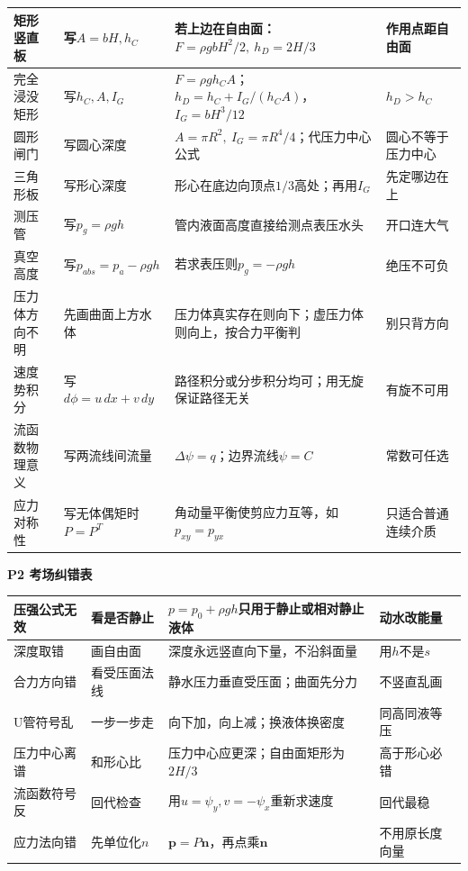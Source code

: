 \documentclass[UTF8,a4paper]{ctexart}
\newcommand{\ftitle}[1]{\vspace{1pt}\textbf{\textcolor{B}{#1}}\par\vspace{0.5pt}}
\begin{document}
\begin{tabular}{|L{0.19\textwidth}|L{0.23\textwidth}|L{0.34\textwidth}|L{0.19\textwidth}|}\hline
矩形竖直板 & 写$A=bH,h_C$ & 若上边在自由面：$F=\rho gbH^2/2,\ h_D=2H/3$ & 作用点距自由面 \\\hline
完全浸没矩形 & 写$h_C,A,I_G$ & $F=\rho gh_CA$；$h_D=h_C+I_G/(h_CA)$，$I_G=bH^3/12$ & $h_D>h_C$ \\\hline
圆形闸门 & 写圆心深度 & $A=\pi R^2,\ I_G=\pi R^4/4$；代压力中心公式 & 圆心不等于压力中心 \\\hline
三角形板 & 写形心深度 & 形心在底边向顶点$1/3$高处；再用$I_G$ & 先定哪边在上 \\\hline
测压管 & 写$p_g=\rho gh$ & 管内液面高度直接给测点表压水头 & 开口连大气 \\\hline
真空高度 & 写$p_{abs}=p_a-\rho gh$ & 若求表压则$p_g=-\rho gh$ & 绝压不可负 \\\hline
压力体方向不明 & 先画曲面上方水体 & 压力体真实存在则向下；虚压力体则向上，按合力平衡判 & 别只背方向 \\\hline
速度势积分 & 写$d\phi=u\,dx+v\,dy$ & 路径积分或分步积分均可；用无旋保证路径无关 & 有旋不可用 \\\hline
流函数物理意义 & 写两流线间流量 & $\Delta\psi=q$；边界流线$\psi=C$ & 常数可任选 \\\hline
应力对称性 & 写无体偶矩时$P=P^T$ & 角动量平衡使剪应力互等，如$p_{xy}=p_{yx}$ & 只适合普通连续介质 \\\hline
\end{tabular}
\ftitle{P2 考场纠错表}
\begin{tabular}{|L{0.22\textwidth}|L{0.25\textwidth}|L{0.33\textwidth}|L{0.15\textwidth}|}\hline
压强公式无效 & 看是否静止 & $p=p_0+\rho gh$只用于静止或相对静止液体 & 动水改能量 \\\hline
深度取错 & 画自由面 & 深度永远竖直向下量，不沿斜面量 & 用$h$不是$s$ \\\hline
合力方向错 & 看受压面法线 & 静水压力垂直受压面；曲面先分力 & 不竖直乱画 \\\hline
U管符号乱 & 一步一步走 & 向下加，向上减；换液体换密度 & 同高同液等压 \\\hline
压力中心离谱 & 和形心比 & 压力中心应更深；自由面矩形为$2H/3$ & 高于形心必错 \\\hline
流函数符号反 & 回代检查 & 用$u=\psi_y,v=-\psi_x$重新求速度 & 回代最稳 \\\hline
应力法向错 & 先单位化$n$ & $\bm p=P\bm n$，再点乘$\bm n$ & 不用原长度向量 \\\hline
\end{tabular}
\end{document}
